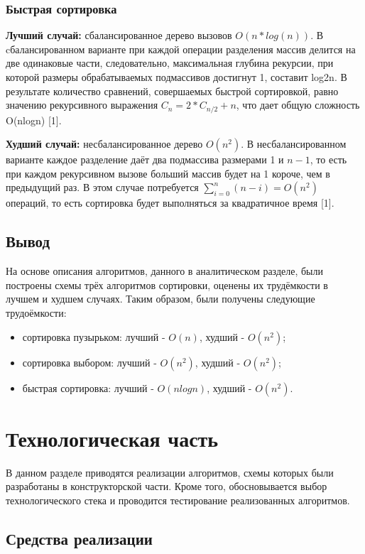 \documentclass[12pt]{report}
\begin{document}
\subsection{Быстрая сортировка}
\textbf{Лучший случай:} сбалансированное дерево вызовов \(O(n*log(n))\). 
В cбалансированном варианте при каждой операции разделения массив делится на две одинаковые части, следовательно, максимальная глубина рекурсии, при которой размеры обрабатываемых подмассивов достигнут 1, составит log2n. В результате количество сравнений, совершаемых быстрой сортировкой, равно значению рекурсивного выражения $C_n = 2 * C_{n / 2} + n$, что дает общую сложность O(nlogn) [1].

\textbf{Худший случай:} несбалансированное дерево $O(n^2)$.
В несбалансированном варианте каждое разделение даёт два подмассива размерами 1 и $n - 1$, то есть при каждом рекурсивном вызове больший массив будет на 1 короче, чем в предыдущий раз. В этом случае потребуется $\sum_{{i=0}}^{n}(n-i)=O(n^{2})$ операций, то есть сортировка будет выполняться за квадратичное время [1].
\section{Вывод}
На основе описания алгоритмов, данного в аналитическом разделе, были построены схемы трёх алгоритмов сортировки, оценены их трудёмкости в лучшем и худшем случаях. Таким образом, были получены следующие трудоёмкости:
\begin{itemize}
\item сортировка пузырьком: лучший - $O(n)$, худший - $O(n^2)$;
\item сортировка выбором: лучший - $O(n^2)$, худший - $O(n^2)$;
\item быстрая сортировка: лучший - $O(nlogn)$, худший - $O(n^2)$.
\end{itemize}

\newpage
\chapter{Технологическая часть}
В данном разделе приводятся реализации алгоритмов, схемы которых были разработаны в конструкторской части. Кроме того, обосновывается выбор технологического стека и проводится тестирование реализованных алгоритмов.

\section{Средства реализации}
\end{document}

